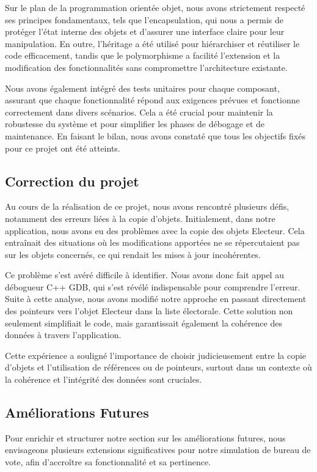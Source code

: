 \documentclass[12pt]{article} %
\begin{document}
	Sur le plan de la programmation orientée objet, nous avons strictement respecté ses principes fondamentaux, tels que l'encapsulation, qui nous a permis de protéger l'état interne des objets et d'assurer une interface claire pour leur manipulation. En outre, l'héritage a été utilisé pour hiérarchiser et réutiliser le code efficacement, tandis que le polymorphisme a facilité l'extension et la modification des fonctionnalités sans compromettre l'architecture existante.
	
	Nous avons également intégré des tests unitaires pour chaque composant, assurant que chaque fonctionnalité répond aux exigences prévues et fonctionne correctement dans divers scénarios. Cela a été crucial pour maintenir la robustesse du système et pour simplifier les phases de débogage et de maintenance. En faisant le bilan, nous avons constaté que tous les objectifs fixés pour ce projet ont été atteints.
	
	\subsection*{Correction du projet}
	Au cours de la réalisation de ce projet, nous avons rencontré plusieurs défis, notamment des erreurs liées à la copie d'objets. Initialement, dans notre application, nous avons eu des problèmes avec la copie des objets Electeur. Cela entraînait des situations où les modifications apportées ne se répercutaient pas sur les objets concernés, ce qui rendait les mises à jour incohérentes.
	
	Ce problème s'est avéré difficile à identifier. Nous avons donc fait appel au débogueur C++ GDB, qui s'est révélé indispensable pour comprendre l'erreur. Suite à cette analyse, nous avons modifié notre approche en passant directement des pointeurs vers l'objet Electeur dans la liste électorale. Cette solution non seulement simplifiait le code, mais garantissait également la cohérence des données à travers l'application.
	
	Cette expérience a souligné l'importance de choisir judicieusement entre la copie d'objets et l'utilisation de références ou de pointeurs, surtout dans un contexte où la cohérence et l'intégrité des données sont cruciales.
	
	\subsection*{Améliorations Futures}

	Pour enrichir et structurer notre section sur les améliorations futures, nous envisageons plusieurs extensions significatives pour notre simulation de bureau de vote, afin d'accroître sa fonctionnalité et sa pertinence.
	
\end{document}
